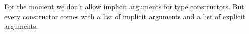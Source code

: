For the moment we don't allow implicit arguments for type constructors.
But every constructor comes with a list of implicit arguments and a list of explicit arguments.

\begin{prooftree}
\end{prooftree}

\begin{prooftree}
\end{prooftree}






